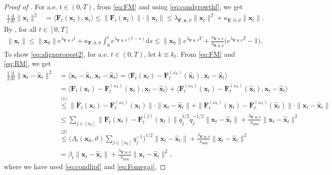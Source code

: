 \documentclass[twoside,11pt]{article}
\theoremstyle{plain}
\newcommand{\diff}{\mathrm{d}}
\newcommand{\bfF}{\mathbf{F}}
\newcommand{\bfx}{\mathbf{x}}
\begin{document}
\begin{proof}[Proof of ]
For a.e. $t\in(0,T)$, from \eqref{eq:FM} and using \eqref{eq:condgrowthf}, we get
\begin{align*}
    \frac{1}{2}\frac{\diff}{\diff t}\|\bfx_t\|^2 &= \langle \bfF_t(\bfx_t), \bfx_t \rangle\leq\|\bfF_t(\bfx_t)\|\cdot\|\bfx_t\|\leq \lambda_{\bfF,\bfx,\vartheta} \|\bfx_t\|^2 +\kappa_{\bfF,0,\vartheta} \|\bfx_t\|.
\end{align*}
By , for all $t\in[0,T]$
\begin{align*}
\|\bfx_t\| \leq \|\bfx_{0}\|e^{\lambda_{\bfF,\bfx,\vartheta} t}
+ \kappa_{\bfF,0,\vartheta}\int_0^t e^{\lambda_{\bfF,\bfx,\vartheta}(t-s)}\diff s \leq \|\bfx_{0}\|e^{\lambda_{\bfF,\bfx,\vartheta} T}
+ \frac{\kappa_{\bfF,0,\vartheta}}{\lambda_{\bfF,\bfx,\vartheta}}\bigl(e^{\lambda_{\bfF,\bfx,\vartheta} T}-1\bigr).
\end{align*}
To show \eqref{eq:alignpropest2}, for a.e. $t\in(0,T)$, let $k\equiv k_t$. From \eqref{eq:FM} and \eqref{eq:RM}, we get
\begin{align}\label{eq:alignpropest}
\nonumber\frac{1}{2}\frac{\diff}{\diff t}\|\bfx_t-\hat{\bfx}_t\|^2&=\langle \dot{\bfx}_t- \dot{\hat{\bfx}}_t,\bfx_t-\hat{\bfx}_t \rangle  = \langle \bfF_t(\bfx_t)-\bfF^{(\omega_k)}_t(\hat{\bfx}_t),\bfx_t-\hat{\bfx}_t  \rangle\\
\nonumber&= \langle \bfF_t(\bfx_t)-\bfF^{(\omega_k)}_t(\bfx_t),\bfx_t-\hat{\bfx}_t  \rangle+ \langle \bfF^{(\omega_k)}_t(\bfx_t)-\bfF^{(\omega_k)}_t(\hat{\bfx}_t),\bfx_t-\hat{\bfx}_t  \rangle\\
\nonumber&\overset{\text{(1)} }{\leq} \|\bfF_t(\bfx_t)-\bfF^{(\omega_k)}_t(\bfx_t)\|\cdot\|\bfx_t-\hat{\bfx}_t\|+\|\bfF^{(\omega_k)}_t(\bfx_t)-\bfF^{(\omega_k)}_t(\hat{\bfx}_t)\|\cdot\|\bfx_t-\hat{\bfx}_t\|\\
\nonumber&\leq \sum_{j\in[n_b]}\|\bfF_t(\bfx_t)-\bfF^{(j)}_t(\bfx_t)\|q_j^{1/2}q_j^{-1/2} \|\bfx_t-\hat{\bfx}_t\|+
\frac{\lambda_{\bfF,\bfx,\vartheta}}{\pi_{\text{min}}}\|\bfx_t-\hat{\bfx}_t\|^2\\
&\overset{\text{(2)} }{\leq}\Big(\Lambda_t(\bfx_0,\vartheta)\sum_{j\in[n_b]}q_j^{-1}\Big)^{1/2}\|\bfx_t-\hat{\bfx}_t\|+\frac{\lambda_{\bfF,\bfx,\vartheta}}{\pi_{\text{min}}}\|\bfx_t-\hat{\bfx}_t\|^2\nonumber\\
&=\beta_t\|\bfx_t-\hat{\bfx}_t\|+\frac{\lambda_{\bfF,\bfx,\vartheta}}{\pi_{\text{min}}}\|\bfx_t-\hat{\bfx}_t\|^2,
\end{align}
where we have used \eqref{eq:condlipf} and \eqref{eq:Fomegaj},

\end{proof}
\end{document}
